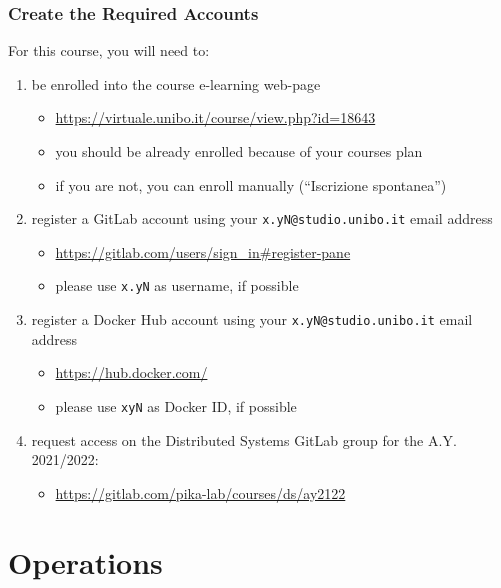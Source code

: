 \documentclass[handout]{beamer}\mode<presentation>{\usetheme{AMSBolognaFC}}
\begin{document}
\begin{frame}\label{configure-accounts}
\frametitle{Create the Required Accounts}

    For this course, you will need to:
    \begin{enumerate}
        \item be enrolled into the course e-learning web-page
        \begin{itemize}
            \item \url{https://virtuale.unibo.it/course/view.php?id=18643}
            \item you should be already enrolled because of your courses plan
            \item if you are not, you can enroll manually (``Iscrizione spontanea'')
        \end{itemize}

        \item register a GitLab account using your \alert{\texttt{x.yN@studio.unibo.it}} email address
        \begin{itemize}
            \item \url{https://gitlab.com/users/sign_in\#register-pane}
            \item please use \texttt{x.yN} as username, if possible
        \end{itemize}

		\item register a Docker Hub account using your \alert{\texttt{x.yN@studio.unibo.it}} email address
		\begin{itemize}
			\item \url{https://hub.docker.com/}
			\item please use \texttt{xyN} as Docker ID, if possible
		\end{itemize}

        \item request access on the Distributed Systems GitLab group for the A.Y. 2021/2022:
        \begin{itemize}
            \item \url{https://gitlab.com/pika-lab/courses/ds/ay2122}
        \end{itemize}

    \end{enumerate}

\end{frame}

\section{Operations}
\end{document}
